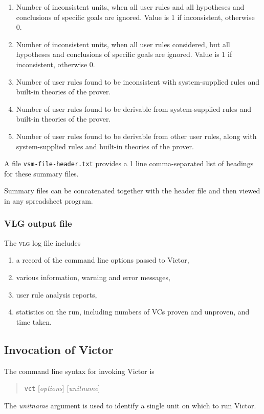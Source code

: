 \documentclass[12pt,fleqn]{article}
\newcommand{\logfile}{\textsc{vlg}}
\begin{document}
\begin{enumerate}
\item Number of inconsistent units, when all user rules and all
  hypotheses and conclusions of specific goals are ignored.  Value is
  1 if inconsistent, otherwise 0.
\item Number of inconsistent units, when all user rules considered,
  but all hypotheses and conclusions of specific goals are ignored.
  Value is 1 if inconsistent, otherwise 0.
\item Number of user rules found to be inconsistent with system-supplied rules
  and built-in theories of the prover. 
\item Number of user rules found to be derivable from system-supplied rules
  and built-in theories of the prover. 
\item Number of user rules found to be derivable from other user
  rules, along with system-supplied rules and built-in theories of
  the prover.

\end{enumerate}
A file \texttt{vsm-file-header.txt} provides a 1 line comma-separated list
of headings for these summary files.

Summary files can be concatenated together with the header file and then 
viewed in any spreadsheet program.

\subsubsection{VLG output file}
The \logfile{} log file includes
\begin{enumerate}
\item a record of the command line options passed to Victor,
\item various information, warning and error messages,
\item user rule analysis reports,
\item statistics on the run, including numbers of VCs proven and unproven,
  and time taken.
\end{enumerate}

\subsection{Invocation of Victor}
The command line syntax for invoking Victor is
\begin{quote}
  \texttt{vct} [\textit{options}] [\textit{unitname}] 
\end{quote}
The \textit{unitname} argument is used to identify a single unit on which 
to run Victor.
\end{document}
